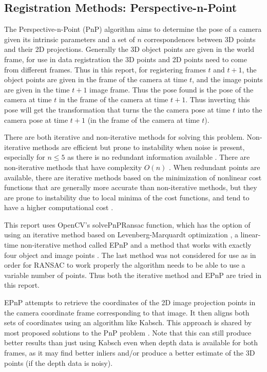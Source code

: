 \documentclass[12pt,a4paper]{article}
\begin{document}
  \subsection{Registration Methods: Perspective-n-Point}
    \label{ssec: BI PnP}
    The Perspective-n-Point (PnP) algorithm aims to determine the pose of a camera given its intrinsic parameters and a set of $n$ correspondences between 3D points and their 2D projections. Generally the 3D object points are given in the world frame, for use in data registration the 3D points and 2D points need to come from different frames. Thus in this report, for registering frames $t$ and $t+1$, the object points are given in the frame of the camera at time $t$, and the image points are given in the time $t+1$ image frame. Thus the pose found is the pose of the camera at time $t$ in the frame of the camera at time $t+1$. Thus inverting this pose will get the transformation that turns the the camera pose at time $t$ into the camera pose at time $t+1$ (in the frame of the camera at time $t$).
     
    There are both iterative and non-iterative methods for solving this problem. Non-iterative methods are efficient but prone to instability when noise is present, especially for $n \leq 5$ as there is no redundant information available \cite{li2012robust}. There are non-iterative methods that have complexity $O(n)$ \cite{lepetit2009epnp,li2012robust}. When redundant points are available, there are iterative methods based on the minimization of nonlinear cost functions that are generally more accurate than non-iterative methods, but they are prone to instability due to local minima of the cost functions, and tend to have a higher computational cost \cite{li2012robust}. 
     
    This report uses OpenCV's solvePnPRansac function, which has the option of using an iterative method based on Levenberg-Marquardt optimization \cite{more1978levenberg}, a linear-time non-iterative method called EPnP \cite{lepetit2009epnp} and a method that works with exactly four object and image points \cite{gao2003complete}. The last method was not considered for use as in order for RANSAC to work properly the algorithm needs to be able to use a variable number of points. Thus both the iterative method and EPnP are tried in this report.
     
    EPnP attempts to retrieve the coordinates of the 2D image projection points in the camera coordinate frame corresponding to that image. It then aligns both sets of coordinates using an algorithm like Kabsch. This approach is shared by most proposed solutions to the PnP problem \cite{lepetit2009epnp}. Note that this can still produce better results than just using Kabsch even when depth data is available for both frames, as it may find better inliers and/or produce a better estimate of the 3D points (if the depth data is noisy).
     
\end{document}

